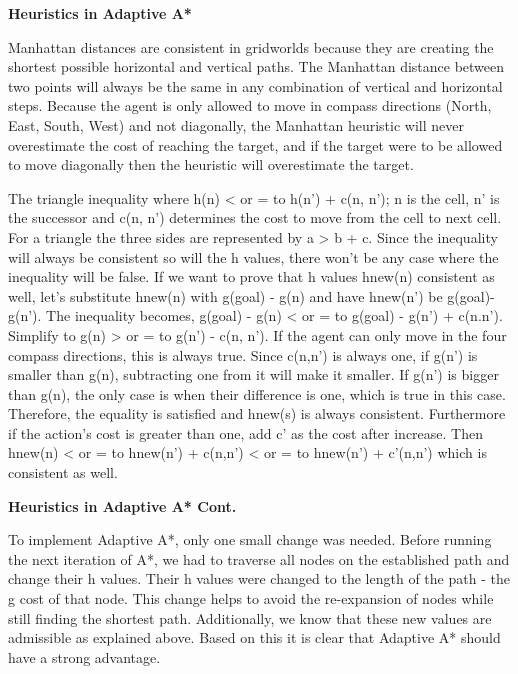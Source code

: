 \documentclass[12pt, letterpaper, twoside]{article}
\begin{document}
\newpage
\begin{center}
    \textbf{Heuristics in Adaptive A*}
\end{center}
\begin{flushleft}
Manhattan distances are consistent in gridworlds because they are creating the shortest possible horizontal and vertical paths. The Manhattan distance between two points will always be the same in any combination of vertical and horizontal steps. Because the agent is only allowed to move in compass directions (North, East, South, West) and not diagonally, the Manhattan heuristic will never overestimate the cost of reaching the target, and if the target were to be allowed to move diagonally then the heuristic will overestimate the target.
\end{flushleft}
\begin{flushleft}
The triangle inequality where h(n) < or = to h(n’) + c(n, n’); n is the cell, n’ is the successor and c(n, n’) determines the cost to move from the cell to next cell. For a triangle the three sides are represented by a > b + c. Since the inequality will always be consistent so will the h values, there won’t be any case where the inequality will be false. If we want to prove that h values hnew(n) consistent as well, let's substitute hnew(n) with g(goal) - g(n) and have hnew(n') be g(goal)-g(n'). The inequality becomes, g(goal) - g(n) < or = to g(goal) - g(n') + c(n.n'). Simplify to g(n) > or = to g(n') - c(n, n'). If the agent can only move in the four compass directions, this is always true. Since c(n,n’) is always one, if g(n’) is smaller than g(n), subtracting one from it will make it smaller. If g(n’) is bigger than g(n), the only case is when their difference is one, which is true in this case. Therefore, the equality is satisfied and hnew(s) is always consistent. Furthermore if the action’s cost is greater than one, add c’ as the cost after increase. Then hnew(n) < or = to hnew(n') + c(n,n’) < or = to hnew(n') + c’(n,n’) which is consistent as well.
\end{flushleft}
\newpage
\begin{center}
    \textbf{Heuristics in Adaptive A* Cont.}
\end{center}
\begin{flushleft}
To implement Adaptive A*, only one small change was needed. Before running the next iteration of A*, we had to traverse all nodes on the established path and change their h values. Their h values were changed to the length of the path - the g cost of that node. This change helps to avoid the re-expansion of nodes while still finding the shortest path. Additionally, we know that these new values are admissible as explained above. Based on this it is clear that Adaptive A* should have a strong advantage. 
\end{flushleft}
\end{document}
